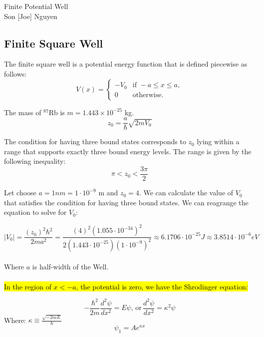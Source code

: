 \documentclass{article}
\begin{document}
\begin{center}
	\LARGE{Finite Potential Well}\\[1em]
	\large Son [Joe] Nguyen\\[1em]
\end{center}

\subsection*{Finite Square Well}
The finite square well is a potential energy function that is defined piecewise as follows:
\begin{equation*}
    V(x) = \begin{cases}
        -V_0 & \text{if } -a \leq x \leq a,\\
        0 & \text{otherwise}.
    \end{cases}
\end{equation*}

\noindent The mass of $^{87}$Rb is $m = 1.443 \times 10^{-25}$ kg.
\[z_0 = \frac{a}{\hbar} \sqrt{2mV_0}\]

\noindent The condition for having three bound states corresponds to \(z_0\) lying within a range that supports
exactly three bound energy levels. The range is given by the following inequality: 
\[\pi < z_0 < \frac{3 \pi}{2} \] 

\noindent Let choose \(a = 1nm =  1 \cdot 10^{-9}\) m and \(z_0 = 4\). We can calculate the value of \(V_0\) that satisfies the condition
for having three bound states. We can reagrange the equation to solve for \(V_0\):

\[|V_0| =  \frac{(z_0)^2 \hbar^2}{2ma^2} = \frac{\left(4\right)^2 (1.055 \cdot 10^{-34})^2}{2 (1.443 \cdot 10^{-25}) (1 \cdot 10^{-9})^2} \approx 6.1706 \cdot 10^{-25} J \approx 3.8514 \cdot 10^{-6}eV\]
\\ 

\noindent Where \(a\) is half-width of the Well. 
\\ \\
\noindent \hl{In the region of $x < -a$, the potential is zero, we have the Shrodinger equation:}

\begin{equation}
    - \frac{\hbar^2}{2m} \frac{d^2 \psi}{d x^2} = E \psi, \, \text{or} \, \frac{d^2 \psi}{d x^2} = \kappa^2 \psi
\end{equation}
Where: \(\kappa \equiv \frac{\sqrt{-2mE}}{\hbar}\)
\begin{equation}
    \psi_1 = Ae^{\kappa x}
\end{equation}
\end{document}

